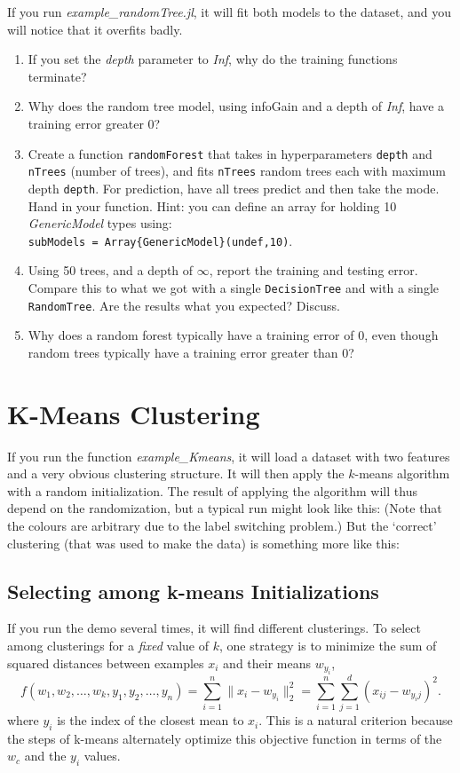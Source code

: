 \documentclass{article}
\def\blu#1{{\color{blu}#1}}
\def\norm#1{\|#1\|}
\def\enum#1{\begin{enumerate}#1\end{enumerate}}
\begin{document}
If you run \emph{example\_randomTree.jl}, it will fit both models to the dataset, and you will notice that it overfits badly.

\blu{
\enum{
\item If you set the \emph{depth} parameter to \emph{Inf}, why do the training functions terminate?
\item Why does the random tree model, using infoGain and a depth of \emph{Inf}, have a training error greater 0?
\item Create a function \texttt{randomForest} that takes in hyperparameters \texttt{depth} and \texttt{nTrees} (number of trees), and 
fits \texttt{nTrees} random trees each with maximum depth \texttt{depth}. For prediction, have all trees predict and then take the mode. Hand in your function. Hint: you can define an array for holding 10 \emph{GenericModel} types using:\\
\texttt{subModels = Array\{GenericModel\}(undef,10)}.
\item Using 50 trees, and a depth of $\infty$, report the training and testing error. Compare this to what we got with a single \texttt{DecisionTree} and with a single \texttt{RandomTree}. Are the results what you expected? Discuss. 
\item Why does a random forest typically have a training error of 0, even though random trees typically have a training error greater than 0?
}
}

\section{K-Means Clustering}

If you run the function \emph{example\_Kmeans}, it will load a dataset with two features and a very obvious clustering structure. It will then apply the $k$-means algorithm with a random initialization. The result of applying the algorithm will thus depend on the randomization, but a typical run might look like this:
(Note that the colours are arbitrary due to the label switching problem.)
But the `correct' clustering (that was used to make the data) is something more like this:

\subsection{Selecting among k-means Initializations}

If you run the demo several times, it will find different clusterings. To select among clusterings for a \emph{fixed} value of $k$, one strategy is to minimize the sum of squared distances between examples $x_i$ and their means $w_{y_i}$,
\[
f(w_1,w_2,\dots,w_k,y_1,y_2,\dots,y_n) = \sum_{i=1}^n \norm{x_i - w_{y_i}}_2^2 = \sum_{i=1}^n \sum_{j=1}^d (x_{ij} - w_{y_ij})^2.
\]
 where $y_i$ is the index of the closest mean to $x_i$. This is a natural criterion because the steps of k-means alternately optimize this objective function in terms of the $w_c$ and the $y_i$ values.
 
\end{document}
